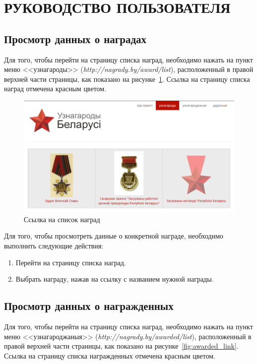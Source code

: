 \section[Руководство пользователя]{РУКОВОДСТВО ПОЛЬЗОВАТЕЛЯ}

\subsection{Просмотр данных о наградах}
\label{ssec:help_awards_list}

Для того, чтобы перейти на страницу списка наград,
необходимо нажать на пункт меню <<узнагароды>> (\textit{http://nagrady.by/award/list}),
расположенный в правой верхней части страницы, 
как показано на рисунке~\ref{fig:awards_link}.
Ссылка на страницу списка наград отмечена красным цветом.

\begin{figure}[h]
  \centering
  \includegraphics[width=160mm]{pic/help_awards_link.png}
  \caption{Ссылка на список наград}
  \label{fig:awards_link}
\end{figure}

Для того, чтобы просмотреть данные о конкретной награде,
необходимо выполнить следующие действия:
\begin{enumerate}
\item Перейти на страницу списка наград.
\item Выбрать награду, нажав на ссылку с названием нужной награды. 
\end{enumerate}

\subsection{Просмотр данных о награжденных}
\label{ssec:help_awarded_list}

Для того, чтобы перейти на страницу списка наград,
необходимо нажать на пункт меню <<узнагароджаныя>> (\textit{http://nagrady.by/awarded/list}),
расположенный в правой верхней части страницы, 
как показано на рисунке~\ref{fig:awarded_link}.
Ссылка на страницу списка награжденных отмечена красным цветом.

